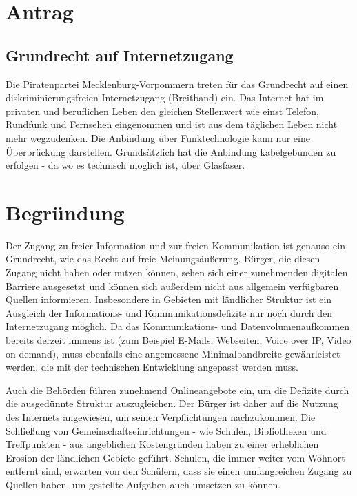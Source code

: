 \section{Antrag}

\subsection{Grundrecht auf Internetzugang}

Die Piratenpartei Mecklenburg-Vorpommern treten für das Grundrecht auf einen diskriminierungsfreien Internetzugang (Breitband) ein. Das Internet hat im privaten und beruflichen Leben den gleichen Stellenwert wie einst Telefon, Rundfunk und Fernsehen eingenommen und ist aus dem täglichen Leben nicht mehr wegzudenken. Die Anbindung über Funktechnologie kann nur eine Überbrückung darstellen. Grundsätzlich hat die Anbindung kabelgebunden zu erfolgen - da wo es technisch möglich ist, über Glasfaser.

\section{Begründung}

Der Zugang zu freier Information und zur freien Kommunikation ist genauso ein Grundrecht, wie das Recht auf freie Meinungsäußerung. Bürger, die diesen Zugang nicht haben oder nutzen können, sehen sich einer zunehmenden digitalen Barriere ausgesetzt und können sich außerdem nicht aus allgemein verfügbaren Quellen informieren. Insbesondere in Gebieten mit ländlicher Struktur ist ein Ausgleich der Informations- und Kommunikationsdefizite nur noch durch den Internetzugang möglich. Da das Kommunikations- und Datenvolumenaufkommen bereits derzeit immens ist (zum Beispiel E-Mails, Webseiten, Voice over IP, Video on demand), muss ebenfalls eine angemessene Minimalbandbreite gewährleistet werden, die mit der technischen Entwicklung angepasst werden muss.

Auch die Behörden führen zunehmend Onlineangebote ein, um die Defizite durch die ausgedünnte Struktur auszugleichen. Der Bürger ist daher auf die Nutzung des Internets angewiesen, um seinen Verpflichtungen nachzukommen. Die Schließung von Gemeinschaftseinrichtungen - wie Schulen, Bibliotheken und Treffpunkten - aus angeblichen Kostengründen haben zu einer erheblichen Erosion der ländlichen Gebiete geführt. Schulen, die immer weiter vom Wohnort entfernt sind, erwarten von den Schülern, dass sie einen umfangreichen Zugang zu Quellen haben, um gestellte Aufgaben auch umsetzen zu können.

